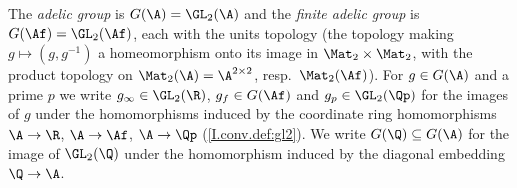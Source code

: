 The \emph{adelic group} is $G(\A)=\GL_2(\A)$ and the \emph{finite adelic group} is $G(\Af)=\GL_2(\Af)$, each with the
units topology (the topology making $g\mapsto(g,g^{-1})$ a homeomorphism onto its image in $\Mat_2\times\Mat_2$, with the
product topology on $\Mat_2(\A)=\A^{2\times2}$, resp.\ $\Mat_2(\Af)$). For $g\in G(\A)$ and a prime $p$ we write
$g_\infty\in\GL_2(\R)$, $g_f\in G(\Af)$ and $g_p\in\GL_2(\Qp)$ for the images of $g$ under the homomorphisms induced by
the coordinate ring homomorphisms $\A\to\R$, $\A\to\Af$, $\A\to\Qp$ (\cref{I.conv.def:gl2}). We write $G(\Q)\subseteq G(\A)$
for the image of $\GL_2(\Q)$ under the homomorphism induced by the diagonal embedding $\Q\to\A$.
